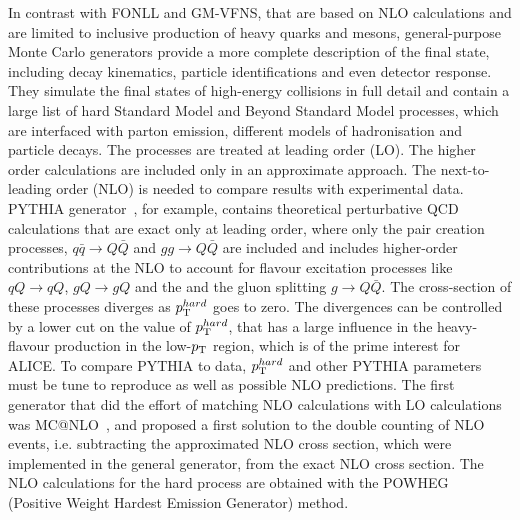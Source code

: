 In contrast with FONLL and GM-VFNS, that are based on NLO calculations and are limited to inclusive production
of heavy quarks and mesons, general-purpose Monte Carlo generators provide a more complete description 
of the final state, including decay kinematics, particle identifications and even detector response. They simulate the 
final states of high-energy collisions in full detail and contain a large list of hard Standard Model and Beyond Standard Model processes, which are interfaced with parton emission, different models of hadronisation and particle decays. 
The processes are treated at leading order (LO). The higher order calculations are included only in an
approximate approach. The next-to-leading order (NLO) is needed to compare results with experimental data.
PYTHIA generator~\cite{Sjostrand:2006za}, for example, contains theoretical perturbative QCD calculations that are exact only
at leading order, where only the pair creation processes, $q\bar{q} \rightarrow Q\bar{Q}$ and $gg \rightarrow Q\bar{Q}$
are included and includes higher-order contributions at the NLO to account 
for flavour excitation processes like $qQ \rightarrow qQ$, $gQ \rightarrow gQ$ and the 
and the gluon splitting $g \rightarrow Q\bar{Q}$. The cross-section of these processes 
diverges as $p_{\rm T}^{hard}$ goes to zero. The divergences can be controlled by a lower cut 
on the value of  $p_{\rm T}^{hard}$, that has a large influence in the heavy-flavour production 
in the low-$p_{\rm T}$ region, which is of the prime interest for ALICE. To compare PYTHIA to data, $p_{\rm T}^{hard}$ and
other PYTHIA parameters must be tune to reproduce as well as possible NLO predictions.
The first generator that did the effort of matching NLO calculations with LO calculations was MC@NLO~\cite{Frixione:2002ik},
and proposed a first solution to the double counting of NLO events, i.e. subtracting the approximated 
NLO cross section, which were implemented in the general generator, from the exact NLO cross section.
The NLO calculations for the hard process are obtained with the POWHEG~\cite{Frixione:2007nw} (Positive Weight Hardest Emission Generator) method. 

